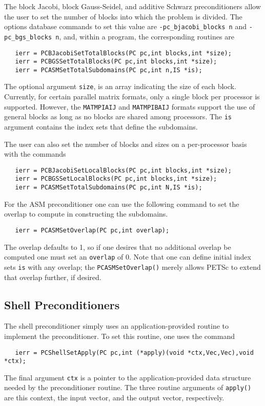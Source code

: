 The block Jacobi, block Gauss-Seidel, and additive Schwarz 
preconditioners allow the user
to set the number of blocks into which the problem is divided.  The
options database commands to set this value are {\tt -pc\_bjacobi\_blocks n}
and {\tt -pc\_bgs\_blocks n}, and, within a program, the corresponding routines
are  
  
\begin{verbatim}
   ierr = PCBJacobiSetTotalBlocks(PC pc,int blocks,int *size);
   ierr = PCBGSSetTotalBlocks(PC pc,int blocks,int *size);
   ierr = PCASMSetTotalSubdomains(PC pc,int n,IS *is);
\end{verbatim}
   
The 
optional argument {\tt size}, is an array indicating the size of
each block. Currently, for certain parallel matrix formats, only a
single block per processor is supported. However, the {\tt MATMPIAIJ} and 
{\tt MATMPIBAIJ} formats
support the use of general blocks as long as no blocks are shared
among processors. The {\tt is} argument contains the index sets that
define the subdomains.

The user can also set the number of blocks and sizes on a per-processor
basis with the commands
\begin{verbatim}
   ierr = PCBJacobiSetLocalBlocks(PC pc,int blocks,int *size);
   ierr = PCBGSSetLocalBlocks(PC pc,int blocks,int *size);
   ierr = PCASMSetTotalSubdomains(PC pc,int N,IS *is);
\end{verbatim}

For the ASM preconditioner one can use the following command to set
the overlap to compute in constructing the subdomains.
\begin{verbatim}
   ierr = PCASMSetOverlap(PC pc,int overlap);
\end{verbatim}
The 
 overlap defaults to 1, so if one desires that no additional overlap 
be computed one must set an {\tt overlap} of 0. Note that one can
define initial index sets {\tt is} with any overlap;
the {\tt PCASMSetOverlap()} merely allows PETSc to extend 
that overlap further, if desired.

\subsection{Shell Preconditioners}

The shell preconditioner simply uses an application-provided routine to 
implement the preconditioner. To set this routine, one uses the 
command 
\begin{verbatim}
   ierr = PCShellSetApply(PC pc,int (*apply)(void *ctx,Vec,Vec),void *ctx);
\end{verbatim}
The final argument {\tt ctx} is a pointer to the application-provided 
data structure needed by the preconditioner routine.
The three routine arguments of {\tt apply()} are this context, the
input vector, and the output vector, respectively.

